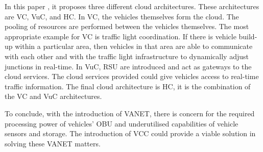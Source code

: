 In this paper \citep{Hussain2012RethinkingComputing}, it proposes three different cloud architectures. These architectures are \ac{VC}, \ac{VuC}, and \ac{HC}. In \ac{VC}, the vehicles themselves form the cloud. The pooling of resources are performed between the vehicles themselves. The most appropriate example for \ac{VC} is traffic light coordination. If there is vehicle build-up within a particular area, then vehicles in that area are able to communicate with each other and with the traffic light infrastructure to dynamically adjust junctions in real-time. In \ac{VuC}, \ac{RSU} are introduced and act as gateways to the cloud services. The cloud services provided could give vehicles access to real-time traffic information. The final cloud architecture is \ac{HC}, it is the combination of the \ac{VC} and \ac{VuC} architectures.

To conclude, with the introduction of \ac{VANET}, there is concern for the required processing power of vehicles' \ac{OBU} and underutilised capabilities of vehicle sensors and storage. The introduction of \ac{VCC} could provide a viable solution in solving these \ac{VANET} matters.